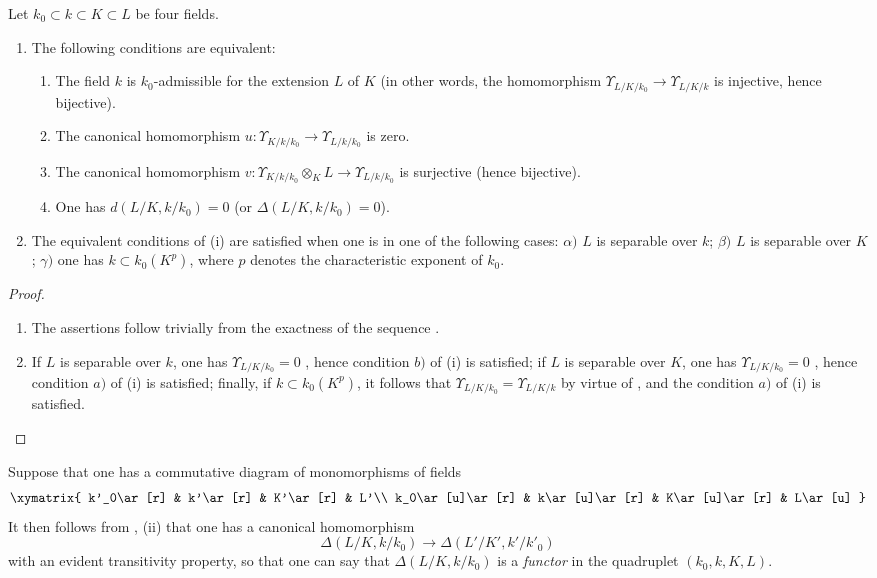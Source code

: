 \begin{proposition}[21.6.2]
\label{0.21.6.2}
Let $k_0\subset k\subset K\subset L$ be four fields.
\begin{enumerate}
  \item[\rm (i)] The following conditions are equivalent:
  \begin{enumerate}
    \item[\rm a)] The field $k$ is $k_0$-admissible for the extension $L$ of $K$ \textup{(}in other words, the homomorphism $\Upsilon_{L/K/k_0}\to\Upsilon_{L/K/k}$ is injective, hence bijective\textup{)}.
    \item[\rm b)] The canonical homomorphism $u:\Upsilon_{K/k/k_0}\to\Upsilon_{L/k/k_0}$ is zero.
    \item[\rm c)] The canonical homomorphism $v:\Upsilon_{K/k/k_0}\otimes_K L\to\Upsilon_{L/k/k_0}$ is surjective \textup{(}hence bijective\textup{)}.
    \item[\rm d)] One has $d(L/K,k/k_0)=0$ \textup{(}or $\Delta(L/K,k/k_0)=0$\textup{)}.
  \end{enumerate}
  \item[\rm (ii)] The equivalent conditions of \textnormal{(i)} are satisfied when one is in one of the following cases: $\alpha)$ $L$ is separable over $k$; $\beta)$ $L$ is separable over $K$; $\gamma)$ one has $k\subset k_0(K^p)$, where $p$ denotes the characteristic exponent of $k_0$.
\end{enumerate}
\end{proposition}

\begin{proof}
\begin{enumerate}
  \item[(i)] The assertions follow trivially from the exactness of the sequence .
  \item[(ii)] If $L$ is separable over $k$, one has $\Upsilon_{L/K/k_0}=0$ , hence condition $b)$ of (i) is satisfied; if $L$ is separable over $K$, one has $\Upsilon_{L/K/k_0}=0$ , hence condition $a)$ of (i) is satisfied; finally, if $k\subset k_0(K^p)$, it follows that $\Upsilon_{L/K/k_0}=\Upsilon_{L/K/k}$ by virtue of , and the condition $a)$ of (i) is satisfied.
\end{enumerate}
\end{proof}

\begin{env}[21.6.3]
\label{0.21.6.3}
Suppose that one has a commutative diagram of monomorphisms of fields
\[
  \xymatrix{
    k'_0\ar[r] & k'\ar[r] & K'\ar[r] & L'\\
    k_0\ar[u]\ar[r] & k\ar[u]\ar[r] & K\ar[u]\ar[r] & L\ar[u]
  }
\]
It then follows from , (ii) that one has a canonical homomorphism
\begin{equation}
\tag{21.6.3.1}
  \label{0.21.6.3.1}
  \Delta(L/K,k/k_0)\to\Delta(L'/K',k'/k'_0)
\end{equation}
with an evident transitivity property, so that one can say that $\Delta(L/K,k/k_0)$ is a \emph{functor} in the quadruplet $(k_0,k,K,L)$.
\end{env}

